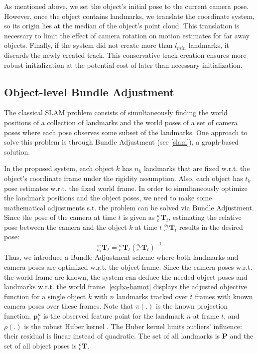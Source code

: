 \documentclass[headsepline, hidelinks, footsepline, footinclude=false, oneside, fontsize=11pt, paper=a4, listof=totoc, bibliography=totoc]{scrbook}
\begin{document}
As mentioned above, we set the object's initial pose to the current camera pose. 
However, once the object contains landmarks, we translate the coordinate system, so its origin lies at the median of the object's point cloud. 
This translation is necessary to limit the effect of camera rotation on motion estimates for far away objects. 
Finally, if the system did not create more than \(l_{min}\) landmarks, it discards the newly created track. 
This conservative track creation ensures more robust initialization at the potential cost of later than necessary initialization. 

\subsection{Object-level Bundle Adjustment \label{object-lvl-ba}}
\label{sec:org160d92d}
The classical SLAM problem consists of simultaneously finding the world positions of a collection of landmarks and the world poses of a set of camera poses where each pose observes some subset of the landmarks. One approach to solve this problem is through Bundle Adjustment (see \cref{slam}), a graph-based solution.

In the proposed system, each object \(k\) has \(n_k\) landmarks that are fixed w.r.t. the object's coordinate frame under the rigidity assumption.
Also, each object has \(t_k\) pose estimates w.r.t. the fixed world frame.
In order to simultaneously optimize the landmark positions and the object poses, we need to make some mathematical adjustments s.t. the problem can be solved via Bundle Adjustment.
Since the pose of the camera at time \(t\) is given as \({}^{w}_{c}\mathbf{T}_t\), estimating the relative pose between the camera and the object \(k\) at time \(t\) \({}^{o_k}_{c}\mathbf{T}_t\) results in the desired pose: 
\begin{equation}
{}^{w}_{o_k}\mathbf{T}_t = {}^{w}_{c}\mathbf{T}_t ({}^{o_k}_{c}\mathbf{T}_t)^{-1}
\end{equation}
Thus, we introduce a Bundle Adjustment scheme where both landmarks and camera poses are optimized w.r.t. the object frame. 
Since the camera poses w.r.t. the world frame are known, the system can deduce the needed object poses and landmarks w.r.t. the world frame.
\cref{eq:ba-bamot} displays the adjusted objective function for a single object \(k\) with \(n\) landmarks tracked over \(t\) frames with known camera poses over these frames. 
Note that \(\pi(.)\) is the known projection function, \(\mathbf{p}_{t}^{n}\) is the observed feature point for the landmark \(n\) at frame \(t\), and \(\rho(.)\) is the robust Huber kernel \cite{huberRobustEstimationLocation1964}. 
The Huber kernel limits outliers' influence: their residual is linear instead of quadratic.
The set of all landmarks is \(\mathbf{P}\) and the set of all object poses is \({}^o_c\mathbf{T}\).
\end{document}
